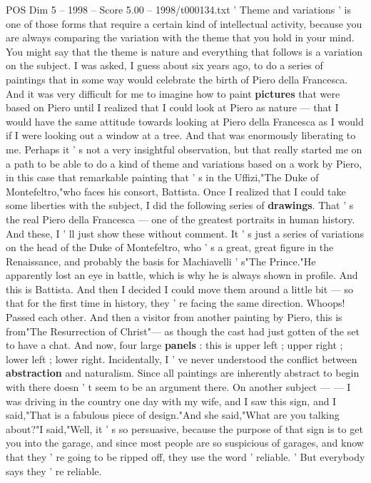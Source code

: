 \begin{textsample}{POS Dim 5 – 1998 – Score 5.00 – 1998/t000134.txt}  \label{ex:f5_pos_011}
' Theme and variations ' is one of those forms that require a certain kind of intellectual activity, because you are always comparing the variation with the theme that you hold in your mind.
You might say that the theme is nature and everything that follows is a variation on the subject.
I was asked, I guess about six years ago, to do a series of paintings that in some way would celebrate the birth of Piero della Francesca.
And it was very difficult for me to imagine how to paint \textbf{pictures} that were based on Piero until I realized that I could look at Piero as nature — that I would have the same attitude towards looking at Piero della Francesca as I would if I were looking out a window at a tree.
And that was enormously liberating to me.
Perhaps it ' s not a very insightful observation, but that really started me on a path to be able to do a kind of theme and variations based on a work by Piero, in this case that remarkable painting that ' s in the Uffizi,"The Duke of Montefeltro,"who faces his consort, Battista.
Once I realized that I could take some liberties with the subject, I did the following series of \textbf{drawings}.
That ' s the real Piero della Francesca — one of the greatest portraits in human history.
And these, I ' ll just show these without comment.
It ' s just a series of variations on the head of the Duke of Montefeltro, who ' s a great, great figure in the Renaissance, and probably the basis for Machiavelli ' s"The Prince."He apparently lost an eye in battle, which is why he is always shown in profile.
And this is Battista.
And then I decided I could move them around a little bit — so that for the first time in history, they ' re facing the same direction.
Whoops!
Passed each other.
And then a visitor from another painting by Piero, this is from"The Resurrection of Christ"— as though the cast had just gotten of the set to have a chat.
And now, four large \textbf{panels} : this is upper left ; upper right ; lower left ; lower right.
Incidentally, I ' ve never understood the conflict between \textbf{abstraction} and naturalism.
Since all paintings are inherently abstract to begin with there doesn ' t seem to be an argument there.
On another subject — — I was driving in the country one day with my wife, and I saw this sign, and I said,"That is a fabulous piece of design."And she said,"What are you talking about?"I said,"Well, it ' s so persuasive, because the purpose of that sign is to get you into the garage, and since most people are so suspicious of garages, and know that they ' re going to be ripped off, they use the word ' reliable. ' But everybody says they ' re reliable.

\end{textsample}
